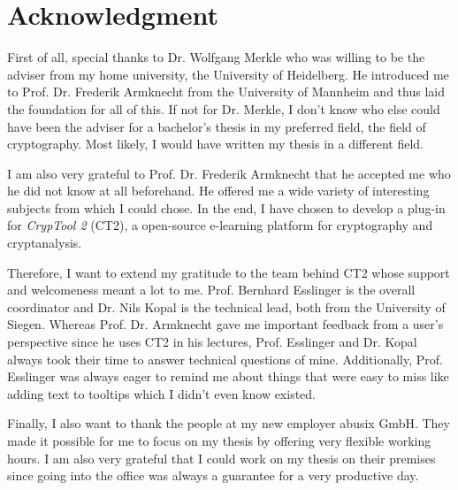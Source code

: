 
\section*{Acknowledgment}

First of all, special thanks to Dr. Wolfgang Merkle who was willing to be the adviser from my home university, the University of Heidelberg. He introduced me to Prof. Dr. Frederik Armknecht from the University of Mannheim and thus laid the foundation for all of this. If not for Dr. Merkle, I don't know who else could have been the adviser for a bachelor's thesis in my preferred field, the field of cryptography. Most likely, I would have written my thesis in a different field.

\medskip
\noindent
I am also very grateful to Prof. Dr. Frederik Armknecht that he accepted me who he did not know at all beforehand. He offered me a wide variety of interesting subjects from which I could chose. In the end, I have chosen to develop a plug-in for \textit{CrypTool 2} (CT2), a open-source e-learning platform for cryptography and cryptanalysis.

\medskip
\noindent
Therefore, I want to extend my gratitude to the team behind CT2 whose support and welcomeness meant a lot to me. Prof. Bernhard Esslinger is the overall coordinator and Dr. Nils Kopal is the technical lead, both from the University of Siegen.
Whereas Prof. Dr. Armknecht gave me important feedback from a user's perspective since he uses CT2 in his lectures, Prof. Esslinger and Dr. Kopal always took their time to answer technical questions of mine. Additionally, Prof. Esslinger was always eager to remind me about things that were easy to miss like adding text to tooltips which I didn't even know existed. 

\medskip
\noindent
Finally, I also want to thank the people at my new employer abusix GmbH. They made it possible for me to focus on my thesis by offering very flexible working hours. I am also very grateful that I could work on my thesis on their premises since going into the office was always a guarantee for a very productive day.
